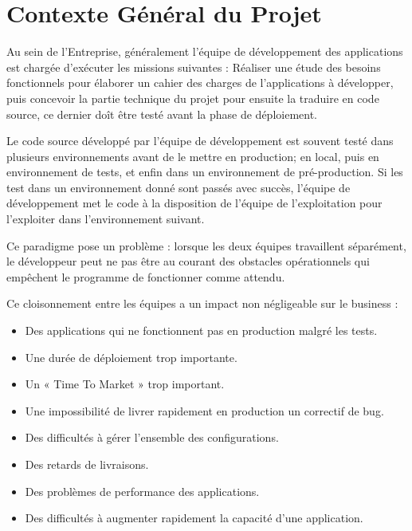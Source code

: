 \section{Contexte Général du Projet}

Au sein de l’Entreprise, généralement l'équipe de développement des applications est chargée d’exécuter les missions suivantes : Réaliser une étude des besoins fonctionnels pour élaborer un cahier des charges de l’applications à développer, puis concevoir la partie technique du projet pour ensuite la traduire en code source, ce dernier doît être testé avant la phase de déploiement.
\newline

Le code source développé par l’équipe de développement est souvent testé dans plusieurs environnements avant de le mettre en production; en local, puis en environnement de tests, et enfin dans un environnement de pré-production. Si les test dans un environnement donné sont passés avec succès, l'équipe de développement met le code à la disposition de l’équipe de l’exploitation pour l’exploiter dans l’environnement suivant.
\newline

Ce paradigme pose un problème : lorsque les deux équipes travaillent séparément, le développeur peut ne pas être au courant des obstacles opérationnels qui empêchent le programme de fonctionner comme attendu.
\newline

Ce cloisonnement entre les équipes a un impact non négligeable sur le business :
\begin{itemize}
\item Des applications qui ne fonctionnent pas en production malgré les tests.
\item Une durée de déploiement trop importante.
\item Un « Time To Market » trop important.
\item Une impossibilité de livrer rapidement en production un correctif de bug.
\item Des difficultés à gérer l’ensemble des configurations.
\item Des retards de livraisons.
\item Des problèmes de performance des applications.
\item Des difficultés à augmenter rapidement la capacité d’une application.
\newline
\end{itemize}

